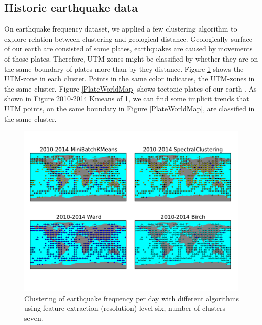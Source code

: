 \documentclass{article}
\begin{document}


\subsection{Historic earthquake data}
On earthquake frequency dataset, we applied a few clustering algorithm to explore relation between clustering and geological distance. Geologically surface of our earth are consisted of some plates, earthquakes are caused by movements of those plates. Therefore, UTM zones might be classified by whether they are on the same boundary of plates more than by they distance.
Figure \ref{EarthquakeWorldMap} shows the UTM-zone in each cluster. Points in the same color indicates, the UTM-zones in the same cluster. Figure \ref{PlateWorldMap} shows tectonic plates of our earth \cite{WTP15}. As shown in Figure 2010-2014 Kmeans of \ref{EarthquakeWorldMap},
we can find some implicit trends that UTM points, on the same boundary in Figure \ref{PlateWorldMap}, are classified in the same cluster.

\begin{figure}
\includegraphics[width=0.99\textwidth]{../earthquakedata/output_map_plot/grid(year=2010-2014,level=6,number_of_cluster=7).pdf}
\caption{Clustering of earthquake frequency per day with different algorithms
using feature extraction (resolution) level six, number of clusters seven.}
\label{EarthquakeWorldMap}
\end{figure}
\end{document}
